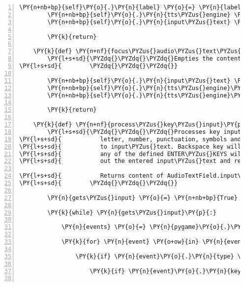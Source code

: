 \begin{Verbatim}[commandchars=\\\{\},numbers=left,firstnumber=1,stepnumber=1]
        \PY{n+nb+bp}{self}\PY{o}{.}\PY{n}{label} \PY{o}{=} \PY{n}{label}
        \PY{n+nb+bp}{self}\PY{o}{.}\PY{n}{tts\PYZus{}engine} \PY{o}{=} \PY{n}{tts\PYZus{}engine}
        \PY{n+nb+bp}{self}\PY{o}{.}\PY{n}{input\PYZus{}text} \PY{o}{=} \PY{n}{input\PYZus{}text}

        \PY{k}{return}

    \PY{k}{def} \PY{n+nf}{focus\PYZus{}audio\PYZus{}text\PYZus{}field}\PY{p}{(}\PY{n+nb+bp}{self}\PY{p}{)}\PY{p}{:}
        \PY{l+s+sd}{\PYZdq{}\PYZdq{}\PYZdq{}Empties the content of the AudioTextField an reads out the label.}
\PY{l+s+sd}{        \PYZdq{}\PYZdq{}\PYZdq{}}

        \PY{n+nb+bp}{self}\PY{o}{.}\PY{n}{input\PYZus{}text} \PY{o}{=} \PY{l+s}{\PYZsq{}}\PY{l+s}{\PYZsq{}}
        \PY{n+nb+bp}{self}\PY{o}{.}\PY{n}{tts\PYZus{}engine}\PY{o}{.}\PY{n}{say}\PY{p}{(}\PY{n+nb+bp}{self}\PY{o}{.}\PY{n}{label}\PY{p}{)}
        \PY{n+nb+bp}{self}\PY{o}{.}\PY{n}{tts\PYZus{}engine}\PY{o}{.}\PY{n}{runAndWait}\PY{p}{(}\PY{p}{)}

        \PY{k}{return}

    \PY{k}{def} \PY{n+nf}{process\PYZus{}key\PYZus{}input}\PY{p}{(}\PY{n+nb+bp}{self}\PY{p}{)}\PY{p}{:}
        \PY{l+s+sd}{\PYZdq{}\PYZdq{}\PYZdq{}Processes key input while active. Any Unicode symbols of category}
\PY{l+s+sd}{           letter, number, punctuation, symbols and separators will be appended}
\PY{l+s+sd}{           to input\PYZus{}text. Backspace key will delete the last entered symbol and}
\PY{l+s+sd}{           any of the defined ENTER\PYZus{}KEYS will end the input processing and read}
\PY{l+s+sd}{           out the entered input\PYZus{}text and return it.}

\PY{l+s+sd}{           Returns content of AudioTextField.input\PYZus{}text}
\PY{l+s+sd}{        \PYZdq{}\PYZdq{}\PYZdq{}}

        \PY{n}{gets\PYZus{}input} \PY{o}{=} \PY{n+nb+bp}{True}

        \PY{k}{while} \PY{n}{gets\PYZus{}input}\PY{p}{:}

            \PY{n}{events} \PY{o}{=} \PY{n}{pygame}\PY{o}{.}\PY{n}{event}\PY{o}{.}\PY{n}{get}\PY{p}{(}\PY{p}{)}

            \PY{k}{for} \PY{n}{event} \PY{o+ow}{in} \PY{n}{events}\PY{p}{:}

                \PY{k}{if} \PY{n}{event}\PY{o}{.}\PY{n}{type} \PY{o}{==} \PY{n}{pygame}\PY{o}{.}\PY{n}{KEYDOWN}\PY{p}{:}

                    \PY{k}{if} \PY{n}{event}\PY{o}{.}\PY{n}{key} \PY{o}{==} \PY{n}{pygame}\PY{o}{.}\PY{n}{K\PYZus{}BACKSPACE}\PY{p}{:}


\end{Verbatim}
